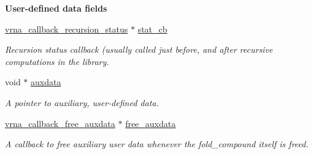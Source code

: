 \begin{Indent}\textbf{ User-\/defined data fields}\par
\begin{DoxyCompactItemize}
\item 
\hyperlink{group__fold__compound_gac86036fa8cad1108832335063243cdc8}{vrna\+\_\+callback\+\_\+recursion\+\_\+status} $\ast$ \hyperlink{group__fold__compound_a87a83f6795b569000efcbe65acc3dd81}{stat\+\_\+cb}
\begin{DoxyCompactList}\small\item\em Recursion status callback (usually called just before, and after recursive computations in the library. \end{DoxyCompactList}\item 
void $\ast$ \hyperlink{group__fold__compound_a20048e0c369e9f24b55423d600037c68}{auxdata}
\begin{DoxyCompactList}\small\item\em A pointer to auxiliary, user-\/defined data. \end{DoxyCompactList}\item 
\hyperlink{group__fold__compound_ga7806651f51b195013839a218b3bbd5a3}{vrna\+\_\+callback\+\_\+free\+\_\+auxdata} $\ast$ \hyperlink{group__fold__compound_a8e84dbabab016ecd74da6c38cb94e816}{free\+\_\+auxdata}
\begin{DoxyCompactList}\small\item\em A callback to free auxiliary user data whenever the fold\+\_\+compound itself is free\textquotesingle{}d. \end{DoxyCompactList}\end{DoxyCompactItemize}
\end{Indent}
